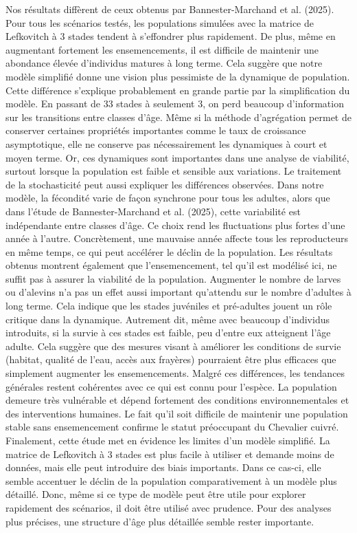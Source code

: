 \documentclass[9pt,twocolumn,twoside,]{pnas-new}
\begin{document}
Nos résultats diffèrent de ceux obtenus par Bannester-Marchand et al.
(2025). Pour tous les scénarios testés, les populations simulées avec la
matrice de Lefkovitch à 3 stades tendent à s'effondrer plus rapidement.
De plus, même en augmentant fortement les ensemencements, il est
difficile de maintenir une abondance élevée d'individus matures à long
terme. Cela suggère que notre modèle simplifié donne une vision plus
pessimiste de la dynamique de population. Cette différence s'explique
probablement en grande partie par la simplification du modèle. En
passant de 33 stades à seulement 3, on perd beaucoup d'information sur
les transitions entre classes d'âge. Même si la méthode d'agrégation
permet de conserver certaines propriétés importantes comme le taux de
croissance asymptotique, elle ne conserve pas nécessairement les
dynamiques à court et moyen terme. Or, ces dynamiques sont importantes
dans une analyse de viabilité, surtout lorsque la population est faible
et sensible aux variations. Le traitement de la stochasticité peut aussi
expliquer les différences observées. Dans notre modèle, la fécondité
varie de façon synchrone pour tous les adultes, alors que dans l'étude
de Bannester-Marchand et al. (2025), cette variabilité est indépendante
entre classes d'âge. Ce choix rend les fluctuations plus fortes d'une
année à l'autre. Concrètement, une mauvaise année affecte tous les
reproducteurs en même temps, ce qui peut accélérer le déclin de la
population. Les résultats obtenus montrent également que
l'ensemencement, tel qu'il est modélisé ici, ne suffit pas à assurer la
viabilité de la population. Augmenter le nombre de larves ou d'alevins
n'a pas un effet aussi important qu'attendu sur le nombre d'adultes à
long terme. Cela indique que les stades juvéniles et pré-adultes jouent
un rôle critique dans la dynamique. Autrement dit, même avec beaucoup
d'individus introduits, si la survie à ces stades est faible, peu
d'entre eux atteignent l'âge adulte. Cela suggère que des mesures visant
à améliorer les conditions de survie (habitat, qualité de l'eau, accès
aux frayères) pourraient être plus efficaces que simplement augmenter
les ensemencements. Malgré ces différences, les tendances générales
restent cohérentes avec ce qui est connu pour l'espèce. La population
demeure très vulnérable et dépend fortement des conditions
environnementales et des interventions humaines. Le fait qu'il soit
difficile de maintenir une population stable sans ensemencement confirme
le statut préoccupant du Chevalier cuivré. Finalement, cette étude met
en évidence les limites d'un modèle simplifié. La matrice de Lefkovitch
à 3 stades est plus facile à utiliser et demande moins de données, mais
elle peut introduire des biais importants. Dans ce cas-ci, elle semble
accentuer le déclin de la population comparativement à un modèle plus
détaillé. Donc, même si ce type de modèle peut être utile pour explorer
rapidement des scénarios, il doit être utilisé avec prudence. Pour des
analyses plus précises, une structure d'âge plus détaillée semble rester
importante.
\end{document}
